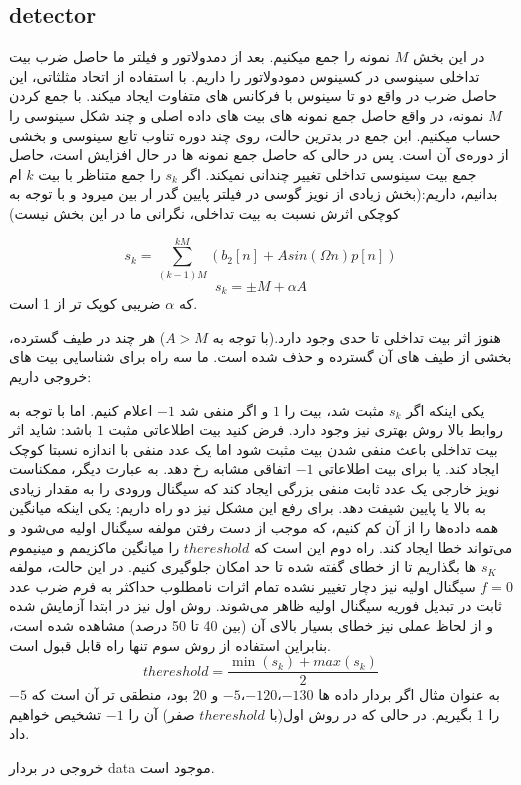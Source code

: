 \documentclass[11pt]{article}
\begin{document}
\begin{persian}
\section{detector}
در این بخش $M$ نمونه را جمع میکنیم. بعد از دمدولاتور و فیلتر ما حاصل ضرب بیت تداخلی سینوسی در کسینوس دمودولاتور را داریم. با استفاده از اتحاد مثلثاتی، این حاصل ضرب در واقع دو تا سینوس با فرکانس های متفاوت ایجاد میکند. با جمع کردن $M$ نمونه، در واقع حاصل جمع نمونه های بیت های داده اصلی و چند شکل سینوسی را حساب میکنیم. ابن جمع در بدترین حالت، روی چند دوره تناوب تابع سینوسی و بخشی از دوره‌ی آن است. پس در حالی که حاصل جمع نمونه ها در حال افزایش است، حاصل جمع بیت سینوسی تداخلی تغییر چندانی نمیکند. اگر $s_k$ را جمع متناظر با بیت $k$ ام بدانیم، داریم:(بخش زیادی از نویز گوسی در فیلتر پایین گدر ار بین میرود و با توجه به کوچکی اثرش نسبت به بیت تداخلی، نگرانی ما در این بخش نیست)

$$
s_k = \sum_{(k-1)M}^{kM} (b_2[n] + A sin(\Omega n) p[n] )
$$
$$
s_k = \pm   M + \alpha A
$$
که $\alpha$ ضریبی کوپک تر از 1 است. 

هنوز اثر بیت تداخلی تا حدی وجود دارد.(با توجه به $A>M$) هر چند در طیف گسترده، بخشی از طیف های آن گسترده و حذف شده است. ما سه راه برای شناسایی بیت های خروجی داریم:


یکی اینکه اگر $s_k$ مثبت شد، بیت را $1$ و اگر منفی شد $-1$ اعلام کنیم. اما با توجه به روابط بالا روش بهتری نیز وجود دارد. فرض کنید بیت اطلاعاتی مثبت $1$  باشد: شاید اثر بیت تداخلی باعث منفی شدن بیت مثبت شود اما یک عدد منفی با اندازه نسبتا کوچک ایجاد کند. یا برای بیت اطلاعاتی $-1$ اتفاقی مشابه رخ دهد. به عبارت دیگر، ممکناست نویز خارجی یک عدد ثابت منفی بزرگی ایجاد کند که سیگنال ورودی  را به مقدار زیادی به بالا یا پایین شیفت دهد. برای رفع این مشکل نیز دو راه داریم: یکی اینکه میانگین همه داده‌ها را از آن کم کنیم، که موجب از دست رفتن مولفه  سیگنال اولیه می‌شود و می‌تواند خطا ایجاد کند. راه دوم این است که $thereshold$ را میانگین ماکزیمم و مینیموم $s_K$ ها بگذاریم تا از خطای گفته شده تا حد امکان جلوگیری کنیم. در این حالت، مولفه $f=0$ سیگنال اولیه نیز دچار تغییر نشده تمام اثرات نامطلوب حداکثر به فرم ضرب عدد ثابت در تبدیل فوریه سیگنال اولیه ظاهر می‌شوند. روش اول نیز در ابتدا آزمایش شده و از لحاظ عملی نیز خطای بسیار بالای آن (بین 40 تا 50 درصد) مشاهده شده است، بنابراین استفاده از روش سوم تنها راه قابل قبول است.
$$
thereshold = \frac{\min(s_k) + max(s_k)}{2}
$$ 
به عنوان مثال اگر بردار داده ها 
$-130$،$-120$،$-5$ و $20$ بود، منطقی تر آن است که $-5$ را 1 بگیریم. در حالی که در روش اول(با $thereshold$ صفر) آن را $-1$ تشخیص خواهیم داد.

خروجی در بردار data موجود است.

\end{persian}
\end{document}
